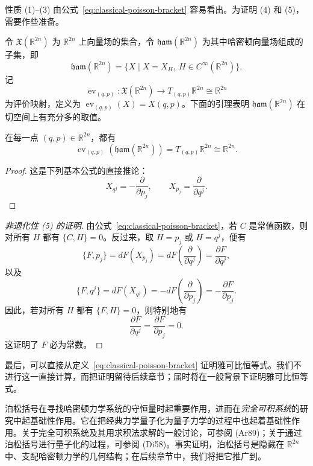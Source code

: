 性质 (1)--(3) 由公式~\eqref{eq:classical-poisson-bracket} 容易看出。为证明 (4) 和 (5)，需要作些准备。

令 $\mathfrak X(\mathbb R^{2n})$ 为 $\mathbb R^{2n}$ 上向量场的集合，令 $\mathfrak{ham}(\mathbb R^{2n})$ 为其中哈密顿向量场组成的子集，即
\[
  \mathfrak{ham}(\mathbb R^{2n})
  =\{X\mid X=X_H,\ H\in C^\infty(\mathbb R^{2n})\}.
\]
记
\[
  \operatorname{ev}_{(q,p)}:\mathfrak X(\mathbb R^{2n})
  \longrightarrow T_{(q,p)}\mathbb R^{2n}\cong\mathbb R^{2n}
\]
为评价映射，定义为 $\operatorname{ev}_{(q,p)}(X)=X(q,p)$。下面的引理表明 $\mathfrak{ham}(\mathbb R^{2n})$ 在切空间上有充分多的取值。

\begin{lemma}
\label{lem:hamiltonian-vector-fields-ample}
在每一点 $(q,p)\in\mathbb R^{2n}$，都有
\[
  \operatorname{ev}_{(q,p)}(\mathfrak{ham}(\mathbb R^{2n}))
  =T_{(q,p)}\mathbb R^{2n}\cong\mathbb R^{2n}.
\]
\end{lemma}

\begin{proof}
这是下列基本公式的直接推论：
\begin{equation}\label{eq:coordinate-hamiltonian-vector-fields}
  X_{q^j}=-\frac{\partial}{\partial p_j},
  \qquad
  X_{p_j}=\frac{\partial}{\partial q^j}.
\end{equation}
\end{proof}

\begin{proof}[非退化性 (5) 的证明]
由公式~\eqref{eq:classical-poisson-bracket}，若 $C$ 是常值函数，则对所有 $H$ 都有 $\{C,H\}=0$。反过来，取 $H=p_j$ 或 $H=q^j$，便有
\[
  \{F,p_j\}=dF(X_{p_j})
  =dF\left(\frac{\partial}{\partial q^j}\right)
  =\frac{\partial F}{\partial q^j},
\]
以及
\[
  \{F,q^j\}=dF(X_{q^j})
  =-dF\left(\frac{\partial}{\partial p_j}\right)
  =-\frac{\partial F}{\partial p_j}.
\]
因此，若对所有 $H$ 都有 $\{F,H\}=0$，则特别地有
\[
  \frac{\partial F}{\partial q^j}
  =\frac{\partial F}{\partial p_j}=0.
\]
这证明了 $F$ 必为常数。
\end{proof}

最后，可以直接从定义~\eqref{eq:classical-poisson-bracket} 证明雅可比恒等式。我们不进行这一直接计算，而把证明留待后续章节；届时将在一般背景下证明雅可比恒等式。

泊松括号在寻找哈密顿力学系统的守恒量时起重要作用，进而在\emph{完全可积系统}的研究中起基础性作用。它在把经典力学量子化为量子力学的过程中也起着基础性作用。关于完全可积系统及其用求积法求解的一般讨论，可参阅 (Ar89)；关于通过泊松括号进行量子化的过程，可参阅 (Di58)。事实证明，泊松括号是隐藏在 $\mathbb R^{2n}$ 中、支配哈密顿力学的几何结构；在后续章节中，我们将把它推广到\emph{\termSymplecticManifold}。
